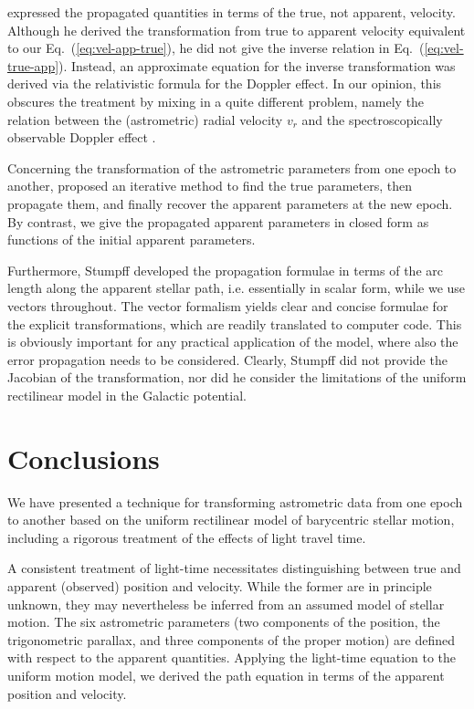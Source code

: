 \documentclass{aa}
\begin{document}
\citet{stumpff1985} expressed the propagated quantities in terms of the true, not apparent,
velocity. Although he derived the transformation from true to apparent velocity equivalent
to our Eq.~(\ref{eq:vel-app-true}), he did not give the inverse relation in
Eq.~(\ref{eq:vel-true-app}). Instead, an approximate equation for the inverse transformation
was derived via the relativistic formula for the Doppler effect. In our opinion, this obscures
the treatment by mixing in a quite different problem, namely the relation between the
(astrometric) radial velocity $v_r$ and the spectroscopically observable Doppler effect
\citep{lindegren_dravins2003}.

Concerning the transformation of the astrometric parameters from one epoch to another,
\cite{stumpff1985} proposed an iterative method to find the true parameters, then propagate
them, and finally recover the apparent parameters at the new epoch. By contrast, we give the propagated
apparent parameters in closed form as functions of the initial apparent parameters.

Furthermore, Stumpff developed the propagation formulae in terms of the arc length along
the apparent stellar path, i.e. essentially in scalar form, while we use vectors throughout.
The vector formalism yields clear and concise formulae for the explicit transformations,
which are readily translated to computer code. This is obviously important for any practical
application of the model, where also the error propagation needs to be considered. Clearly,
Stumpff did not provide the Jacobian of the transformation, nor did he consider the
limitations of the uniform rectilinear model in the Galactic potential.


\section{Conclusions}\label{s:conclusion}

We have presented a technique for transforming astrometric data from one epoch to another based on the uniform rectilinear model of barycentric stellar motion, including a rigorous treatment of the effects of light travel time.

A consistent treatment of light-time necessitates distinguishing between true and apparent (observed) position and velocity. While the former are in principle unknown, they may nevertheless be inferred from an assumed model of stellar motion. The six astrometric parameters (two components of the position, the trigonometric parallax, and three components of the proper motion) are defined with respect to the apparent quantities. Applying the light-time equation to the uniform motion model, we derived the path equation in terms of the apparent position and velocity.
\end{document}
